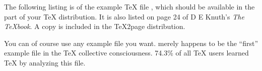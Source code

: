 

\def\meta[#1]{\leavevmode\hbox{\em #1}}

The following listing  is of the example TeX file
, which should be
available in the  part of
your TeX distribution.  It is also listed on page 24 of
D E Knuth's {\em The TeXbook}.  A copy is included in
the TeX2page distribution.

You can of course use any example file you want.  
merely happens to be the ``first'' example file in the TeX
collective consciousness.  74.3\% of all TeX users learned
TeX by analyzing this file.



\bye
